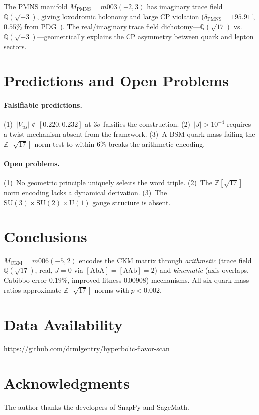 \documentclass[11pt,a4paper]{article}
\begin{document}
The PMNS manifold $M_{\mathrm{PMNS}}=m003(-2,3)$ has imaginary trace
field $\mathbb{Q}(\sqrt{-3})$, giving loxodromic holonomy and large
CP violation ($\delta_{\mathrm{PMNS}}=195.91^\circ$, $0.55\%$ from
PDG~\cite{Gentry:Unified}).
The real/imaginary trace field dichotomy---$\mathbb{Q}(\sqrt{17})$
vs.\ $\mathbb{Q}(\sqrt{-3})$---geometrically explains the CP
asymmetry between quark and lepton sectors.

\section{Predictions and Open Problems}

\paragraph{Falsifiable predictions.}
(1)~$|V_{us}|\notin[0.220,0.232]$ at $3\sigma$ falsifies the construction.
(2)~$|J|>10^{-4}$ requires a twist mechanism absent from the framework.
(3)~A BSM quark mass failing the $\mathbb{Z}[\sqrt{17}]$ norm test
to within $6\%$ breaks the arithmetic encoding.

\paragraph{Open problems.}
(1)~No geometric principle uniquely selects the word triple.
(2)~The $\mathbb{Z}[\sqrt{17}]$ norm encoding lacks a dynamical derivation.
(3)~The $\mathrm{SU}(3)\times\mathrm{SU}(2)\times\mathrm{U}(1)$
gauge structure is absent.

\section{Conclusions}

$M_{\mathrm{CKM}}=m006(-5,2)$ encodes the CKM matrix through
\emph{arithmetic} (trace field $\mathbb{Q}(\sqrt{17})$, real,
$J=0$ via $[\mathrm{AbA}]=[\mathrm{AAb}]=2$) and
\emph{kinematic} (axis overlaps, Cabibbo error $0.19\%$,
improved fitness $0.00908$) mechanisms.
All six quark mass ratios approximate $\mathbb{Z}[\sqrt{17}]$ norms
with $p<0.002$.

\section*{Data Availability}
\url{https://github.com/drmlgentry/hyperbolic-flavor-scan}

\section*{Acknowledgments}
The author thanks the developers of SnapPy and SageMath.
\end{document}
